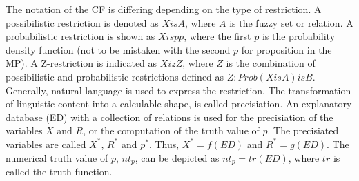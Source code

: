 \documentclass[conference]{IEEEtran}
\begin{document}
The notation of the CF is differing depending on the type of restriction. A possibilistic restriction is denoted as \begin{math} X is A \end{math}, where \begin{math} A \end{math} is the fuzzy set or relation. A probabilistic restriction is shown as \begin{math} X isp p \end{math}, where the first \begin{math} p \end{math} is the probability density function (not to be mistaken with the second \begin{math} p \end{math} for proposition in the MP). A Z-restriction is indicated as \begin{math} X iz Z \end{math}, where \begin{math} Z \end{math} is the combination of possibilistic and probabilistic restrictions defined as \begin{math} Z: Prob(X is A) is B \end{math}.\\

Generally, natural language is used to express the restriction. The transformation of linguistic content into a calculable shape, is called precisiation. An explanatory database (ED) with a collection of relations is used for the precisiation of the variables \begin{math} X \end{math} and \begin{math} R \end{math}, or the computation of the truth value of \begin{math} p \end{math}. The precisiated variables are called \begin{math} X^{*} \end{math}, \begin{math} R^{*} \end{math} and \begin{math}p^{*} \end{math}. Thus, \begin{math} X^{*}=f(ED) \end{math} and \begin{math} R^{*}=g(ED) \end{math}. The numerical truth value of \begin{math} p \end{math}, \begin{math}nt_{p} \end{math}, can be depicted as \begin{math} nt_{p}=tr(ED) \end{math}, where \begin{math} tr \end{math} is called the truth function.
\end{document}
